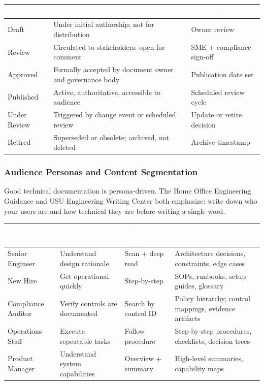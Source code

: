 \documentclass[11pt,letterpaper]{article}
\newcommand{\tableheader}[1]{\textbf{\sffamily\textcolor{white}{#1}}}
\begin{document}
\begin{center}
\begin{tabularx}{\textwidth}{L{3cm}XL{3cm}}
\toprule
{}
\tableheader{State} & \tableheader{Definition} & \tableheader{Gate to Next} \\
\midrule
Draft & Under initial authorship; not for distribution & Owner review \\
Review & Circulated to stakeholders; open for comment & SME + compliance sign-off \\
Approved & Formally accepted by document owner and governance body & Publication date set \\
Published & Active, authoritative, accessible to audience & Scheduled review cycle \\
Under Review & Triggered by change event or scheduled review & Update or retire decision \\
Retired & Superseded or obsolete; archived, not deleted & Archive timestamp \\
\bottomrule
\end{tabularx}
\end{center}

\subsubsection{Audience Personas and Content Segmentation}

Good technical documentation is persona-driven. The Home Office Engineering Guidance and USU Engineering Writing Center both emphasize: write down who your users are and how technical they are before writing a single word.

\begin{center}
\begin{tabularx}{\textwidth}{L{3cm}L{3cm}L{3cm}X}
\toprule
{}
\tableheader{Persona} & \tableheader{Goal} & \tableheader{Reading Mode} & \tableheader{Content Needs} \\
\midrule
Senior Engineer & Understand design rationale & Scan + deep read & Architecture decisions, constraints, edge cases \\
New Hire & Get operational quickly & Step-by-step & SOPs, runbooks, setup guides, glossary \\
Compliance Auditor & Verify controls are documented & Search by control ID & Policy hierarchy, control mappings, evidence artifacts \\
Operations Staff & Execute repeatable tasks & Follow procedure & Step-by-step procedures, checklists, decision trees \\
Product Manager & Understand system capabilities & Overview + summary & High-level summaries, capability maps \\
\bottomrule
\end{tabularx}
\end{center}
\end{document}
